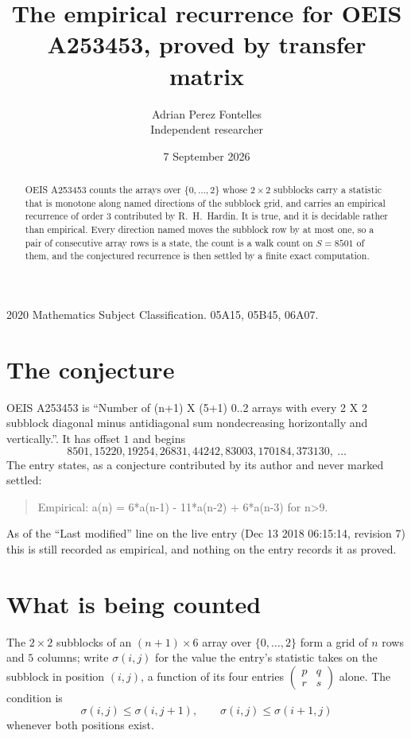 \documentclass[11pt,a4paper]{article}
\title{The empirical recurrence for OEIS A253453, proved by transfer matrix}
\author{Adrian Perez Fontelles\\ \small Independent researcher}
\date{7 September 2026}
\theoremstyle{plain}
\theoremstyle{definition}
\begin{document}
\maketitle

\begin{abstract}
OEIS A253453 counts the arrays over $\{0,\dots,2\}$ whose $2\times2$ subblocks carry a
statistic that is monotone along named directions of the subblock grid, and carries an
empirical recurrence of order $3$ contributed by R.~H.~Hardin. It is true, and it is
decidable rather than empirical. Every direction named moves the subblock row by at most one,
so a pair of consecutive array rows is a state, the count is a walk count on $S=8501$ of them,
and the conjectured recurrence is then settled by a finite exact computation.
\end{abstract}

\noindent\small 2020 Mathematics Subject Classification. 05A15, 05B45, 06A07.\normalsize

\section{The conjecture}

OEIS A253453 is ``Number of (n+1) X (5+1) 0..2 arrays with every 2 X 2 subblock diagonal minus antidiagonal sum nondecreasing horizontally and vertically.''. It has offset $1$ and begins
\[
8501, 15220, 19254, 26831, 44242, 83003, 170184, 373130,\ \dots
\]
The entry states, as a conjecture contributed by its author and never marked settled:
\begin{quote}
Empirical: a(n) = 6*a(n-1) - 11*a(n-2) + 6*a(n-3) for n>9.
\end{quote}
As of the ``Last modified'' line on the live entry (Dec 13 2018 06:15:14, revision 7) this is still
recorded as empirical, and nothing on the entry records it as proved.

\section{What is being counted}

The $2\times2$ subblocks of an $(n+1)\times6$ array over $\{0,\dots,2\}$ form a grid
of $n$ rows and $5$ columns; write $\sigma(i,j)$ for the value the entry's statistic takes on
the subblock in position $(i,j)$, a function of its four entries
$\begin{pmatrix}p&q\\r&s\end{pmatrix}$ alone. The condition is
\[
\sigma(i,j)\le\sigma(i,j+1),\qquad \sigma(i,j)\le\sigma(i+1,j)
\]
whenever both positions exist.
\end{document}
